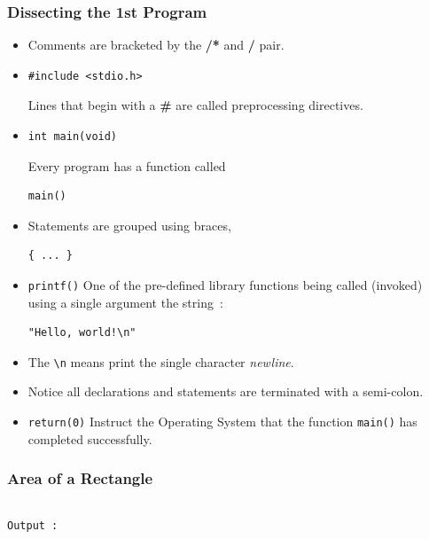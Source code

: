 \begin{frame}[fragile]
\frametitle{Dissecting the 1st Program}

\begin{itemize}[<+->]
\item Comments are bracketed by the {\bf /*} and {\bf */} pair.
\item
\begin{verbatim}
#include <stdio.h>
\end{verbatim}
Lines that begin with a {\bf \#}
are called preprocessing directives.
\item \begin{verbatim}
int main(void)
\end{verbatim}
Every program has a function called \begin{verbatim}
main()
\end{verbatim}

\item Statements are grouped using braces,
\begin{verbatim}
{ ... }
\end{verbatim}

\item \verb+printf()+ One of the pre-defined library functions being called (invoked) using a single argument the string~:
\begin{verbatim}
"Hello, world!\n"
\end{verbatim}
\item The \verb+\n+ means print the single character {\it newline}.
\item Notice all declarations and statements are terminated with a
semi-colon.
\item \verb+return(0)+
Instruct the Operating System that the function
\verb+main()+ has completed successfully.
\end{itemize}
\end{frame}



\begin{frame}[fragile]
\frametitle{Area of a Rectangle}
\begin{columns}

\begin{column}{0.9\textwidth}

{\scriptsize{\tt Output :}}
\end{column}

\end{columns}
\end{frame}

